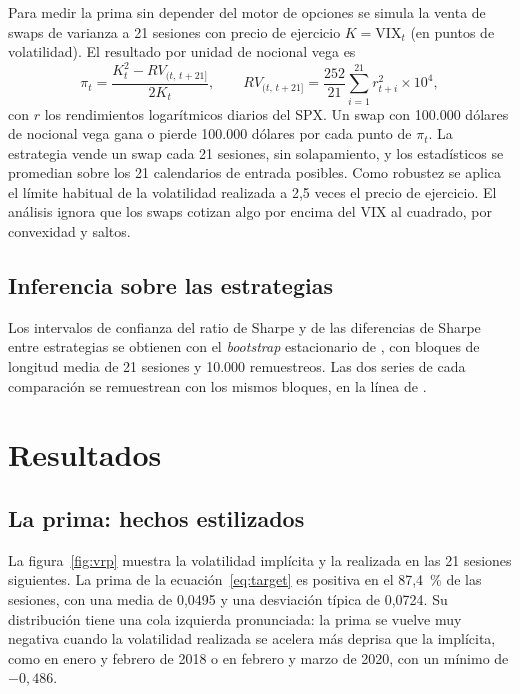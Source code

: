 \documentclass[11pt,a4paper]{article}
\begin{document}
Para medir la prima sin depender del motor de opciones se simula la venta de swaps de varianza a 21 sesiones con precio de ejercicio $K=\text{VIX}_t$ (en puntos de volatilidad). El resultado por unidad de nocional vega es
\begin{equation}\label{eq:vswap}
  \pi_t = \frac{K_t^2 - RV_{(t,\,t+21]}}{2K_t},
  \qquad RV_{(t,\,t+21]} = \frac{252}{21}\sum_{i=1}^{21} r_{t+i}^2 \times 10^4,
\end{equation}
con $r$ los rendimientos logarítmicos diarios del SPX. Un swap con 100.000 dólares de nocional vega gana o pierde 100.000 dólares por cada punto de $\pi_t$. La estrategia vende un swap cada 21 sesiones, sin solapamiento, y los estadísticos se promedian sobre los 21 calendarios de entrada posibles. Como robustez se aplica el límite habitual de la volatilidad realizada a 2,5 veces el precio de ejercicio. El análisis ignora que los swaps cotizan algo por encima del VIX al cuadrado, por convexidad y saltos.

\subsection{Inferencia sobre las estrategias}

Los intervalos de confianza del ratio de Sharpe y de las diferencias de Sharpe entre estrategias se obtienen con el \textit{bootstrap} estacionario de \citet{politisromano1994}, con bloques de longitud media de 21 sesiones y 10.000 remuestreos. Las dos series de cada comparación se remuestrean con los mismos bloques, en la línea de \citet{ledoitwolf2008}.

\section{Resultados}\label{sec:resultados}

\subsection{La prima: hechos estilizados}

La figura~\ref{fig:vrp} muestra la volatilidad implícita y la realizada en las 21 sesiones siguientes. La prima de la ecuación~\eqref{eq:target} es positiva en el 87,4~\% de las sesiones, con una media de 0,0495 y una desviación típica de 0,0724. Su distribución tiene una cola izquierda pronunciada: la prima se vuelve muy negativa cuando la volatilidad realizada se acelera más deprisa que la implícita, como en enero y febrero de 2018 o en febrero y marzo de 2020, con un mínimo de $-0{,}486$.
\end{document}
